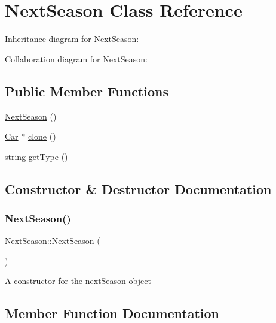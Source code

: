 \hypertarget{classNextSeason}{}\section{Next\+Season Class Reference}
\label{classNextSeason}


Inheritance diagram for Next\+Season\+:


Collaboration diagram for Next\+Season\+:
\subsection*{Public Member Functions}
\begin{DoxyCompactItemize}
\item 
\hyperlink{classNextSeason_a6a1b6579836f99504740c84b10a407aa}{Next\+Season} ()
\item 
\hyperlink{classCar}{Car} $\ast$ \hyperlink{classNextSeason_a79d36fb105db8d21293f905a7e3a78bd}{clone} ()
\item 
string \hyperlink{classNextSeason_abe6df1f0b67eddbf990e9a92f6f68ff4}{get\+Type} ()
\end{DoxyCompactItemize}


\subsection{Constructor \& Destructor Documentation}
\mbox{\label{classNextSeason_a6a1b6579836f99504740c84b10a407aa}} 
\subsubsection{\texorpdfstring{Next\+Season()}{NextSeason()}}
{\footnotesize\ttfamily Next\+Season\+::\+Next\+Season (\begin{DoxyParamCaption}{ }\end{DoxyParamCaption})}

\hyperlink{classA}{A} constructor for the next\+Season object 

\subsection{Member Function Documentation}
\mbox{\label{classNextSeason_a79d36fb105db8d21293f905a7e3a78bd}} 
